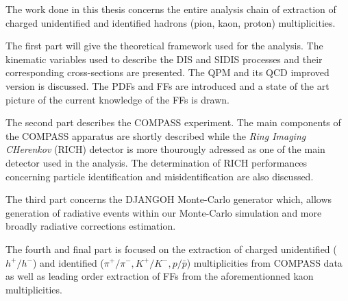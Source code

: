 The work done in this thesis concerns the entire analysis chain of extraction of charged unidentified and identified hadrons (pion, kaon, proton) multiplicities.

The first part will give the theoretical framework used for the analysis. The kinematic variables used to describe the DIS and SIDIS processes and their corresponding cross-sections are presented. The QPM and its QCD improved version is discussed. The PDFs and FFs are introduced and a state of the art picture of the current knowledge of the FFs is drawn.

The second part describes the COMPASS experiment. The main components of the COMPASS apparatus are shortly described while the \textit{Ring Imaging CHerenkov} (RICH) detector is more thourougly adressed as one of the main detector used in the analysis. The determination of RICH performances concerning particle identification and misidentification are also discussed.

The third part concerns the DJANGOH Monte-Carlo generator which, allows generation of radiative events within our Monte-Carlo simulation and more broadly radiative corrections estimation.

The fourth and final part is focused on the extraction of charged unidentified ($h^+/h^-$) and identified ($\pi^+/\pi^-,K^+/K^-,p/\bar{p}$) multiplicities from COMPASS data as well as leading order extraction of FFs from the aforementionned kaon multiplicities.
